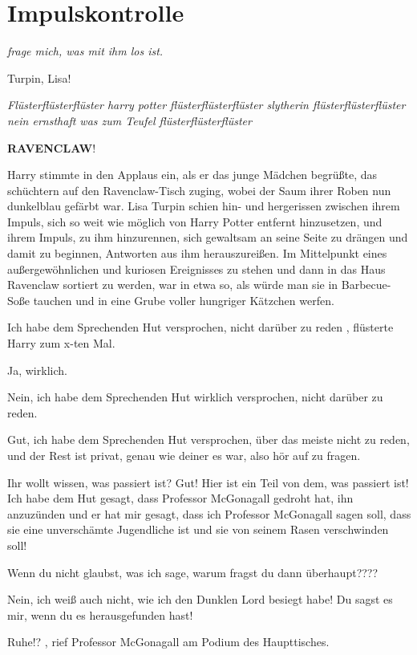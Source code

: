 \chapter{Impulskontrolle}
\emph{ frage mich, was mit ihm los ist.\grqq{} }

\glqq Turpin, Lisa!\grqq{}

\emph{ Flüsterflüsterflüster harry potter flüsterflüsterflüster slytherin
flüsterflüsterflüster nein ernsthaft was zum Teufel flüsterflüsterflüster}

\glqq \textbf{RAVENCLAW}!\grqq{}

Harry stimmte in den Applaus ein, als er das junge Mädchen begrüßte, das
schüchtern auf den Ravenclaw-Tisch zuging, wobei der Saum ihrer Roben nun
dunkelblau gefärbt war. Lisa Turpin schien hin- und hergerissen zwischen ihrem
Impuls, sich so weit wie möglich von Harry Potter entfernt hinzusetzen, und
ihrem Impuls, zu ihm hinzurennen, sich gewaltsam an seine Seite zu drängen und
damit zu beginnen, Antworten aus ihm herauszureißen. Im Mittelpunkt eines
außergewöhnlichen und kuriosen Ereignisses zu stehen und dann in das Haus
Ravenclaw sortiert zu werden, war in etwa so, als würde man sie in Barbecue-Soße
tauchen und in eine Grube voller hungriger Kätzchen werfen.

\glqq Ich habe dem Sprechenden Hut versprochen, nicht darüber zu reden\grqq{} ,
flüsterte Harry zum x-ten Mal.

\glqq Ja, wirklich.\grqq{}

\glqq Nein, ich habe dem Sprechenden Hut wirklich versprochen, nicht darüber zu
reden.\grqq{}

\glqq Gut, ich habe dem Sprechenden Hut versprochen, über das meiste nicht zu
reden, und der Rest ist privat, genau wie deiner es war, also hör auf zu
fragen.\grqq{}

\glqq Ihr wollt wissen, was passiert ist? Gut! Hier ist ein Teil von dem, was
passiert ist! Ich habe dem Hut gesagt, dass Professor McGonagall gedroht hat,
ihn anzuzünden und er hat mir gesagt, dass ich Professor McGonagall sagen soll,
dass sie eine unverschämte Jugendliche ist und sie von seinem Rasen verschwinden
soll!\grqq{}

\glqq Wenn du nicht glaubst, was ich sage, warum fragst du dann
überhaupt????\grqq{}

\glqq Nein, ich weiß auch nicht, wie ich den Dunklen Lord besiegt habe! Du sagst
es mir, wenn du es herausgefunden hast!\grqq{}

\glqq Ruhe!?\grqq{} , rief Professor McGonagall am Podium des Haupttisches.

